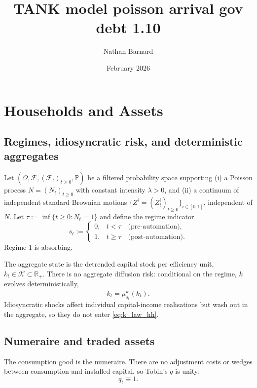 \documentclass{article}
\title{TANK model poisson arrival gov debt 1.10}
\author{Nathan Barnard}
\date{February 2026}
\begin{document}
\maketitle


\section{Households and Assets}\label{sec:hh_assets}

\subsection{Regimes, idiosyncratic risk, and deterministic aggregates}

Let $(\Omega,\mathcal F,(\mathcal F_t)_{t\ge 0},\mathbb P)$ be a filtered probability space supporting
(i) a Poisson process $N=(N_t)_{t\ge 0}$ with constant intensity $\lambda>0$, and
(ii) a continuum of independent standard Brownian motions $\{Z^i=(Z^i_t)_{t\ge 0}\}_{i\in[0,1]}$,
independent of $N$.
Let $\tau := \inf\{t\ge 0: N_t=1\}$ and define the regime indicator
\[
s_t :=
\begin{cases}
0, & t<\tau \quad\text{(pre-automation)},\\
1, & t\ge \tau \quad\text{(post-automation)}.
\end{cases}
\]
Regime $1$ is absorbing.

The aggregate state is the detrended capital stock per efficiency unit, $k_t\in\mathcal K\subset\mathbb R_+$.
There is no aggregate diffusion risk: conditional on the regime, $k$ evolves deterministically,
\begin{equation}\label{eq:k_law_hh}
\dot k_t = \mu^k_{s_t}(k_t).
\end{equation}
Idiosyncratic shocks affect individual capital-income realisations but wash out in the aggregate, so they do not enter \eqref{eq:k_law_hh}.

\subsection{Numeraire and traded assets}

The consumption good is the numeraire. There are no adjustment costs or wedges between consumption and installed capital, so Tobin's $q$ is unity:
\begin{equation}\label{eq:q_one_hh}
q_t \equiv 1.
\end{equation}
\end{document}
